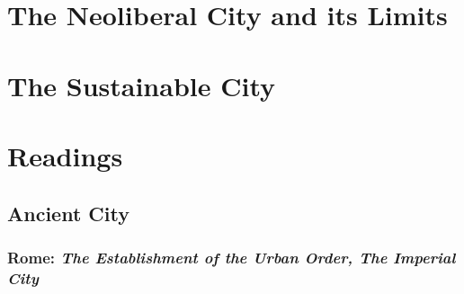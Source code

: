 \documentclass{article}
\begin{document}
\section{The Neoliberal City and its Limits}

\subsection{}

\section{The Sustainable City}

\subsection{}


\section{Readings}

\subsection{Ancient City}

\subsubsection{Rome: \textit{The Establishment of the Urban Order, The Imperial City} \parencite{hall1998cities}}
\end{document}
